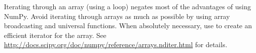 Iterating through an array (using a  loop) negates most of the advantages of using NumPy.
Avoid iterating through arrays as much as possible by using array broadcasting and universal functions.
When absolutely necessary, use  to create an efficient iterator for the array.
See \url{http://docs.scipy.org/doc/numpy/reference/arrays.nditer.html} for details.

